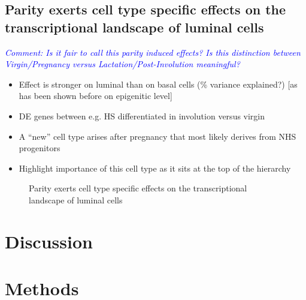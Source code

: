 \documentclass[oneside]{amsart}
\newcommand{\comment}[1]{\textit{\textcolor{blue}{Comment: #1}}}
\begin{document}
\newpage
\subsection{Parity exerts cell type specific effects on the transcriptional landscape of luminal cells\label{sec:ParityEffect}}
\comment{Is it fair to call this parity induced effects? Is this distinction between Virgin/Pregnancy versus Lactation/Post-Involution meaningful?}
\begin{itemize}
    \item Effect is stronger on luminal than on basal cells (\% variance explained?) [as has been shown before on epigenitic level]
    \item DE genes between e.g. HS differentiated in involution versus virgin
    \item A ``new'' cell type arises after pregnancy that most likely derives from NHS progenitors 
    \item Highlight importance of this cell type as it sits at the top of the hierarchy
\end{itemize}


\begin{figure}[h]
\begin{subfigure}{0.45\linewidth}
\centering %
\caption{}
\end{subfigure}
\begin{subfigure}{0.45\linewidth}
\caption{}
\end{subfigure}
\begin{subfigure}{0.45\linewidth}
\centering %
\caption{}
\end{subfigure}
\caption{Parity exerts cell type specific effects on the transcriptional landscape of luminal cells}
      \label{fig:f3}
  \end{figure}

\section{Discussion}
\section{Methods}

\clearpage




\end{document}
